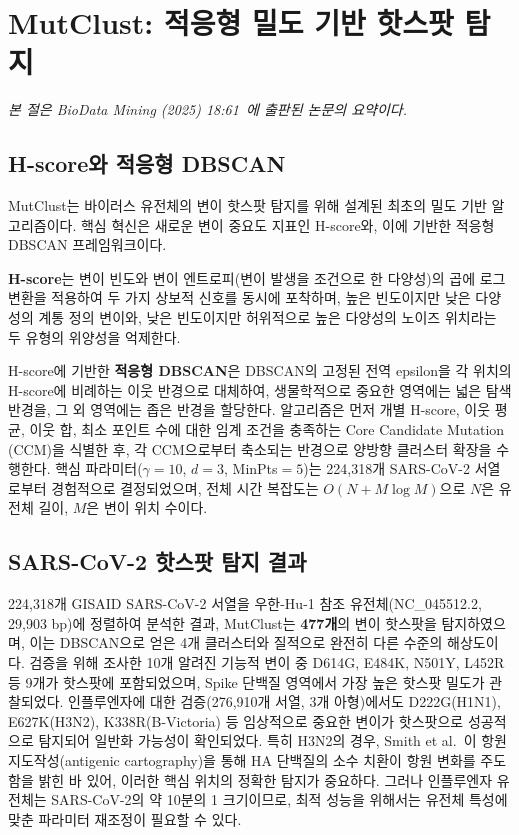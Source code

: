 \section{MutClust: 적응형 밀도 기반 핫스팟 탐지}
\label{sec:mutclust_summary}

\textit{본 절은 BioData Mining (2025) 18:61~\cite{youn2025mutclust}에 출판된 논문의 요약이다.}

\subsection{H-score와 적응형 DBSCAN}
\label{subsec:mutclust_hscore}

MutClust는 바이러스 유전체의 변이 핫스팟 탐지를 위해 설계된 최초의 밀도 기반 알고리즘이다.
핵심 혁신은 새로운 변이 중요도 지표인 H-score와, 이에 기반한 적응형 DBSCAN 프레임워크이다.

\textbf{H-score}는 변이 빈도와 변이 엔트로피(변이 발생을 조건으로 한 다양성)의 곱에 로그 변환을 적용하여 두 가지 상보적 신호를 동시에 포착하며, 높은 빈도이지만 낮은 다양성의 계통 정의 변이와, 낮은 빈도이지만 허위적으로 높은 다양성의 노이즈 위치라는 두 유형의 위양성을 억제한다.

H-score에 기반한 \textbf{적응형 DBSCAN}은 DBSCAN의 고정된 전역 epsilon을 각 위치의 H-score에 비례하는 이웃 반경으로 대체하여, 생물학적으로 중요한 영역에는 넓은 탐색 반경을, 그 외 영역에는 좁은 반경을 할당한다.
알고리즘은 먼저 개별 H-score, 이웃 평균, 이웃 합, 최소 포인트 수에 대한 임계 조건을 충족하는 Core Candidate Mutation (CCM)을 식별한 후, 각 CCM으로부터 축소되는 반경으로 양방향 클러스터 확장을 수행한다.
핵심 파라미터($\gamma=10$, $d=3$, MinPts$=5$)는 224,318개 SARS-CoV-2 서열로부터 경험적으로 결정되었으며, 전체 시간 복잡도는 $O(N + M \log M)$으로 $N$은 유전체 길이, $M$은 변이 위치 수이다.

\subsection{SARS-CoV-2 핫스팟 탐지 결과}
\label{subsec:mutclust_results_summary}

224,318개 GISAID SARS-CoV-2 서열을 우한-Hu-1 참조 유전체(NC\_045512.2, 29,903 bp)에 정렬하여 분석한 결과, MutClust는 \textbf{477개}의 변이 핫스팟을 탐지하였으며, 이는 DBSCAN으로 얻은 4개 클러스터와 질적으로 완전히 다른 수준의 해상도이다.
검증을 위해 조사한 10개 알려진 기능적 변이 중 D614G, E484K, N501Y, L452R 등 9개가 핫스팟에 포함되었으며, Spike 단백질 영역에서 가장 높은 핫스팟 밀도가 관찰되었다.
인플루엔자에 대한 검증(276,910개 서열, 3개 아형)에서도 D222G(H1N1), E627K(H3N2), K338R(B-Victoria) 등 임상적으로 중요한 변이가 핫스팟으로 성공적으로 탐지되어 일반화 가능성이 확인되었다.
특히 H3N2의 경우, Smith et al.~\cite{smith2004antigenic}이 항원 지도작성(antigenic cartography)을 통해 HA 단백질의 소수 치환이 항원 변화를 주도함을 밝힌 바 있어, 이러한 핵심 위치의 정확한 탐지가 중요하다.
그러나 인플루엔자 유전체는 SARS-CoV-2의 약 10분의 1 크기이므로, 최적 성능을 위해서는 유전체 특성에 맞춘 파라미터 재조정이 필요할 수 있다.

